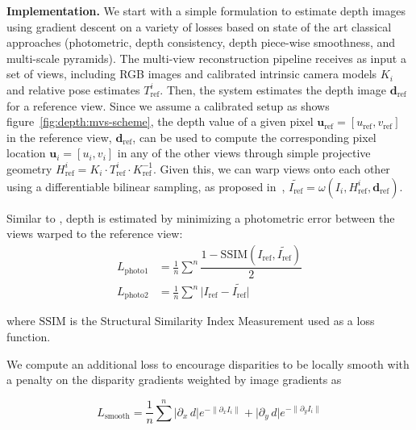 \textbf{Implementation.} We start with a simple formulation to estimate depth images using gradient descent on a variety of losses based on state of the art classical approaches (photometric, depth consistency, depth piece-wise smoothness, and multi-scale pyramids). The multi-view reconstruction pipeline receives as input a set of views, including RGB images and calibrated intrinsic camera models $K_{i}$ and relative pose estimates $T_{\text{ref}}^{i}$.  Then, the system   estimates the depth image $\boldsymbol{d}_{\text{ref}}$ for a reference view. Since we assume a calibrated setup as shows figure~\ref{fig:depth:mvs-scheme}, the depth value of a given pixel $\boldsymbol{u}_{\text{ref}} = [u_{\text{ref}},v_{\text{ref}}]$ in the reference view, $\boldsymbol{d}_{\text{ref}}$, can be used to compute the corresponding pixel location $\boldsymbol{u}_i = [u_{i},v_{i}]$ in any of the other views through simple projective geometry $H_{\text{ref}}^{i} = K_i \cdot T_{\text{ref}}^{i} \cdot K_{\text{ref}}^{-1}$. Given this, we can warp views onto each other %
using a differentiable bilinear sampling, as proposed in~\citep{stn_NIPS2015}, $\tilde{I_{\text{ref}}} = \omega(I_i, H_{\text{ref}}^{i}, \boldsymbol{d}_{\text{ref}})$.

Similar to \citep{dtam_Newcombe2011, monodepth17, superdepth18}, depth is estimated by minimizing a photometric error between the views warped to the reference view:
\begin{align}
	\label{eq:multiview:loss photometric1}
	L_{\text{photo1}} &= \frac{1}{n} \sum\limits^{n} \dfrac{1 - \text{SSIM}(I_{\text{ref}}, \tilde{I_{\text{ref}}})}{2}
	\\
	\label{eq:multiview:loss photometric2}
	L_{\text{photo2}} &= \frac{1}{n} \sum\limits^{n} \lvert I_{\text{ref}} - \tilde{I_{\text{ref}}}\rvert
\end{align}

where $\text{SSIM}$ is the Structural Similarity Index Measurement used as a loss function.

We compute an additional loss to encourage disparities to be locally smooth with a penalty on the disparity gradients weighted by image gradients as 

\begin{equation}
	\label{eq:multiview:loss smoothness}	
	L_{\text{smooth}} = \frac{1}{n} \sum\limits^{n} \lvert \partial_{x} \, d \rvert e^{- \| \partial_{x} I_{i} \|} + \lvert \partial_{y} \, d \rvert e^{- \| \partial_{y} I_{i} \|}
\end{equation}

